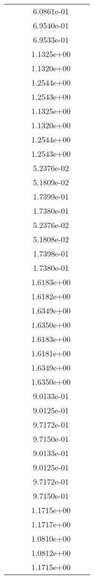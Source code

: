\begin{xltabular}{\textwidth}{r|rS[table-format=1.3e+2]S[table-format=1.4e+2]S[table-format=1.4e+2]S[table-format=-1.5]}
&  &  & 6.0861e-01 & & \\
&  &  & 6.9540e-01 & & \\
&  &  & 6.9533e-01 & & \\
&  &  & 1.1325e+00 & & \\
&  &  & 1.1320e+00 & & \\
&  &  & 1.2544e+00 & & \\
&  &  & 1.2543e+00 & & \\
&  &  & 1.1325e+00 & & \\
&  &  & 1.1320e+00 & & \\
&  &  & 1.2544e+00 & & \\
&  &  & 1.2543e+00 & & \\
&  &  & 5.2376e-02 & & \\
&  &  & 5.1809e-02 & & \\
&  &  & 1.7399e-01 & & \\
&  &  & 1.7380e-01 & & \\
&  &  & 5.2376e-02 & & \\
&  &  & 5.1808e-02 & & \\
&  &  & 1.7398e-01 & & \\
&  &  & 1.7380e-01 & & \\
&  &  & 1.6183e+00 & & \\
&  &  & 1.6182e+00 & & \\
&  &  & 1.6349e+00 & & \\
&  &  & 1.6350e+00 & & \\
&  &  & 1.6183e+00 & & \\
&  &  & 1.6181e+00 & & \\
&  &  & 1.6349e+00 & & \\
&  &  & 1.6350e+00 & & \\
&  &  & 9.0133e-01 & & \\
&  &  & 9.0125e-01 & & \\
&  &  & 9.7172e-01 & & \\
&  &  & 9.7150e-01 & & \\
&  &  & 9.0133e-01 & & \\
&  &  & 9.0125e-01 & & \\
&  &  & 9.7172e-01 & & \\
&  &  & 9.7150e-01 & & \\
&  &  & 1.1715e+00 & & \\
&  &  & 1.1717e+00 & & \\
&  &  & 1.0810e+00 & & \\
&  &  & 1.0812e+00 & & \\
&  &  & 1.1715e+00 & & \\

\end{xltabular}
